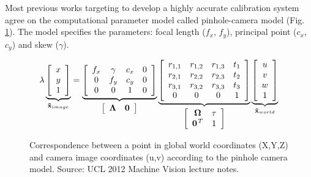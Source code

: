\documentclass{ucl_thesis}
\newcommand{\figref}[1]{(Fig. \ref{#1})}
\begin{document}
Most previous works targeting to develop a highly accurate calibration system agree on the computational parameter model called pinhole-camera model \figref{eq:pinhole}. The model specifies the parameters: focal length ($f_x$, $f_y$), principal point ($c_x$, $c_y$) and skew ($\gamma$).

\begin{figure}[h!]
\begin{equation}
\lambda
\underbrace{
	\left[\begin{array}{ccc}
	    x \\
	    y \\
	    1 \\
	\end{array} \right]
}_{
	{\bf \tilde{x}}_{image}
}
%
=
%
\underbrace{
	\left[\begin{array}{cccc}
			f_x & \gamma & c_x & 0 \\
			0   & f_y    & c_y & 0 \\
	 		0   & 0      & 1   & 0 \\
	\end{array} \right]
}_{
	\left[\begin{array}{cc}
		\bf{\Lambda} & \bf{0}
	\end{array} \right]
}
%
\underbrace{
	\left[\begin{array}{cccc}
	    r_{1,1} & r_{1,2} & r_{1,3} & t_1 \\
	    r_{2,1} & r_{2,2} & r_{2,3} & t_2 \\
	    r_{3,1} & r_{3,2} & r_{3,3} & t_3 \\
	    0       & 0       & 0       & 1 \\
	\end{array} \right]
}_{
	\left[\begin{array}{cc}
		\bf{\Omega}     & \bf{\tau} \\
		\bf{0}^{\it{T}} 	& 1		      \\
	\end{array} \right]
}
%
\underbrace{
	\left[\begin{array}{c}
	    u \\
	    v \\
	    w \\
	    1 \\
	\end{array} \right]
}_{
	{\bf \tilde{x}}_{world}
}
\end{equation}
\caption{Correspondence between a point in global world coordinates (X,Y,Z) and camera image coordinates (u,v) according to the pinhole camera model. Source: UCL 2012 Machine Vision lecture notes. }
\label{eq:pinhole}
\end{figure}
\end{document}
